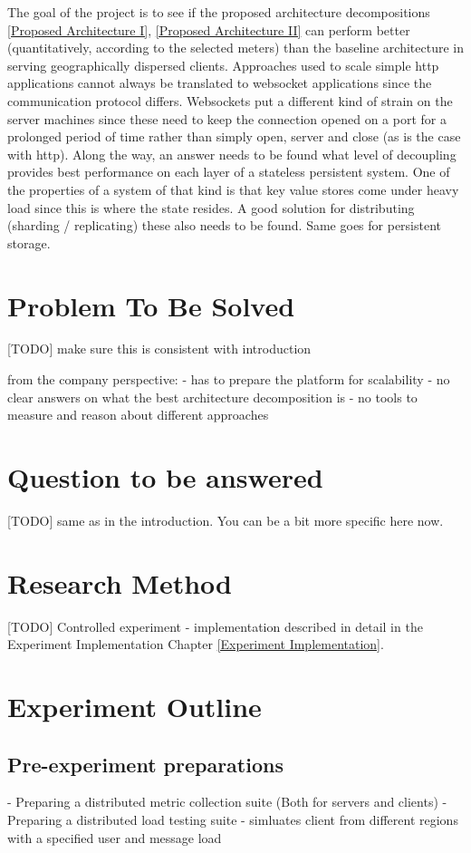 \documentclass{uvamscse}
\begin{document}
The goal of the project is to see if the proposed architecture decompositions \ref{Proposed Architecture I}, \ref{Proposed Architecture II} can perform better (quantitatively, according to the selected meters) than the baseline architecture in serving geographically dispersed clients. Approaches used to scale simple http applications cannot always be translated to websocket applications since the communication protocol differs. Websockets put a different kind of strain on the server machines since these need to keep the connection opened on a port for a prolonged period of time rather than simply open, server and close (as is the case with http). Along the way, an answer needs to be found what level of decoupling provides best performance on each layer of a stateless persistent system. One of the properties of a system of that kind is that key value stores come under heavy load since this is where the state resides. A good solution for distributing (sharding / replicating) these also needs to be found. Same goes for persistent storage.

\section{Problem To Be Solved}
[TODO] make sure this is consistent with introduction

from the company perspective:
  - has to prepare the platform for scalability
  - no clear answers on what the best architecture decomposition is
  - no tools to measure and reason about different approaches 

\section{Question to be answered}
[TODO] same as in the introduction. You can be a bit more specific here now.

\section{Research Method}
[TODO] Controlled experiment - implementation described in detail in the Experiment Implementation Chapter \ref{Experiment Implementation}.

\section{Experiment Outline}

\subsection{Pre-experiment preparations}
- Preparing a distributed metric collection suite (Both for servers and clients)
- Preparing a distributed load testing suite
    - simluates client from different regions with a specified user and message load
\end{document}
